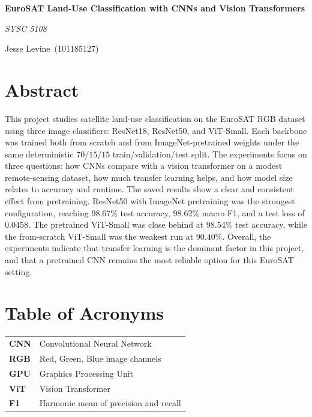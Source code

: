 \documentclass[11pt]{report}
\newcommand{\ProjectTitle}{EuroSAT Land-Use Classification with CNNs and Vision Transformers}
\newcommand{\AuthorName}{Jesse Levine}
\newcommand{\StudentID}{101185127}
\newcommand{\CourseName}{SYSC 5108}
\newcommand{\BestModel}{ResNet50 with ImageNet pretraining}
\newcommand{\BestAcc}{98.67}
\newcommand{\BestMacroFOne}{98.62}
\newcommand{\BestLoss}{0.0458}
\begin{document}

\begin{titlepage}
    \centering
    \vspace*{4.3cm}
    {\Huge\bfseries \ProjectTitle\par}
    \vspace{0.35cm}
    {\Large\itshape \CourseName\par}
    \vspace{2.2cm}
    {\Large \AuthorName\ (\StudentID)\par}
\end{titlepage}


\chapter*{Abstract}
This project studies satellite land-use classification on the EuroSAT RGB dataset using three image classifiers: ResNet18, ResNet50, and ViT-Small. Each backbone was trained both from scratch and from ImageNet-pretrained weights under the same deterministic \(70/15/15\) train/validation/test split. The experiments focus on three questions: how CNNs compare with a vision transformer on a modest remote-sensing dataset, how much transfer learning helps, and how model size relates to accuracy and runtime. The saved results show a clear and consistent effect from pretraining. \BestModel{} was the strongest configuration, reaching \BestAcc{}\% test accuracy, \BestMacroFOne{}\% macro F1, and a test loss of \BestLoss. The pretrained ViT-Small was close behind at \(98.54\%\) test accuracy, while the from-scratch ViT-Small was the weakest run at \(90.40\%\). Overall, the experiments indicate that transfer learning is the dominant factor in this project, and that a pretrained CNN remains the most reliable option for this EuroSAT setting.

\chapter*{Table of Acronyms}
\begin{tabularx}{\textwidth}{>{\bfseries}l X}
    CNN & Convolutional Neural Network \\
    RGB & Red, Green, Blue image channels \\
    GPU & Graphics Processing Unit \\
    ViT & Vision Transformer \\
    F1 & Harmonic mean of precision and recall \\
\end{tabularx}
\end{document}
